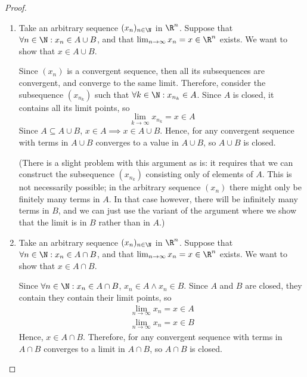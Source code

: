 \documentclass[letterpaper,11pt]{article}
\newcommand{\union}{\cup}
\newcommand{\intersn}{\cap}
\begin{document}
\begin{proof}
  ~

  \begin{enumerate}
    \item
      Take an arbitrary sequence $(x_n)_{n\in\N}$ in $\R^n$.
      Suppose that $\forall n \in \N : x_n \in A \union B$,
      and that $\lim_{n\to\infty} x_n = x \in \R^n$ exists.
      We want to show that $x \in A \union B$.

      Since $(x_n)$ is a convergent sequence, then all its subsequences are
      convergent, and converge to the same limit. Therefore, consider the
      subsequence $(x_{n_k})$ such that $\forall k \in \N : x_{n_k} \in A$.
      Since $A$ is closed, it contains all its limit points, so
      \begin{equation*}
        \lim_{k\to\infty} x_{n_k} = x \in A
      \end{equation*}
      Since $A \subseteq A \union B$, $x \in A \implies x \in A \union B$.
      Hence, for any convergent sequence with terms in $A \union B$ converges
      to a value in $A \union B$, so $A \union B$ is closed.

      (There is a slight problem with this argument as is: it requires that we
      can construct the subsequence $(x_{n_k})$ consisting only of elements of
      $A$. This is not necessarily possible; in the arbitrary sequence $(x_n)$
      there might only be finitely many terms in $A$. In that case however,
      there will be infinitely many terms in $B$, and we can just use the
      variant of the argument where we show that the limit is in $B$ rather
      than in $A$.)

    \item
      Take an arbitrary sequence $(x_n)_{n\in\N}$ in $\R^n$.
      Suppose that $\forall n \in \N : x_n \in A \intersn B$,
      and that $\lim_{n\to\infty} x_n = x \in \R^n$ exists.
      We want to show that $x \in A \intersn B$.

      Since $\forall n \in \N : x_n \in A \intersn B$,
      $x_n \in A \land x_n \in B$. Since $A$ and $B$ are closed, they contain
      they contain their limit points, so
      \begin{align*}
        \lim_{n\to\infty} x_n = x \in A \\
        \lim_{n\to\infty} x_n = x \in B
      \end{align*}
      Hence, $x \in A \intersn B$.
      Therefore, for any convergent sequence with terms in $A \intersn B$
      converges to a limit in $A \intersn B$, so $A \intersn B$ is closed.
  \end{enumerate}
\end{proof}
\end{document}
